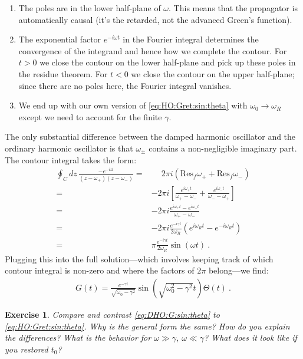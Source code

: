 \documentclass[
  11pt,
	colorful,
	raggedright,
]{tufte-style-thesis-flip}
\newtheorem{exercise}{Exercise}[section]
\begin{document}
 \begin{enumerate}
 \item The poles are in the lower half-plane of $\omega$. This means that the propagator is automatically causal (it's the retarded, not the advanced Green's function).
 \item The exponential factor $e^{-i\omega t}$ in the Fourier integral determines the convergence of the integrand and hence how we complete the contour. For $t>0$ we close the contour on the lower half-plane and pick up these poles in the residue theorem. For $t<0$ we close the contour on the upper half-plane; since there are no poles here, the Fourier integral vanishes.
 \item We end up with our own version of \eqref{eq:HO:Gret:sin:theta} with $\omega_0\to\omega_R$ except we need to account for the finite $\gamma$. 
 \end{enumerate}
 The only substantial difference between the damped harmonic oscillator and the ordinary harmonic oscillator is that $\omega_\pm$ contains a non-negligible imaginary part. The contour integral takes the form:
 \begin{align}
  \oint_C dz \,
  \frac{-e^{-izt}}{
  \left(z-\omega_+\right)
  \left(z-\omega_-\right)
  }
  =&
  \phantom+ 
  2\pi i\left(\text{Res}_f\omega_+ + \text{Res}_f\omega_-\right)
  \\
  =&
  -2\pi i\left[
  \frac{e^{i\omega_+t}}{\omega_+-\omega_-}
  +
  \frac{e^{i\omega_-t}}{\omega_--\omega_+}
  \right]
  \\
  =&
  -2\pi i
  \frac{e^{i\omega_+t} - e^{i\omega_-t}}{\omega_+-\omega_-}
  \\
  =&
  -2\pi i \frac{e^{-i\gamma t}}{2\omega_R}
  \left(e^{i\omega_Rt} - e^{-i\omega_Rt}\right)
  \\
  =&
  \pi \frac{e^{-i\gamma t}}{2\omega_R}
  \sin(\omega t)
   \ .
 \end{align}
 Plugging this into the full solution---which involves keeping track of which contour integral is non-zero and where the factors of $2\pi$ belong---we find:
 \begin{align}
  G(t) = \frac{e^{-\gamma t}}{\sqrt{\omega_0-\gamma^2}} \sin\left(\sqrt{\omega_0^2-\gamma^2} t\right) \Theta(t) \ .
  \label{eq:DHO:G:sin:theta}
 \end{align} 
 \begin{exercise}
Compare and contrast \eqref{eq:DHO:G:sin:theta} to \eqref{eq:HO:Gret:sin:theta}. Why is the general form the same? How do you explain the differences? What is the behavior for $\omega \gg \gamma$, $\omega \ll \gamma$? What does it look like if you restored $t_0$?
 \end{exercise}
\end{document}
